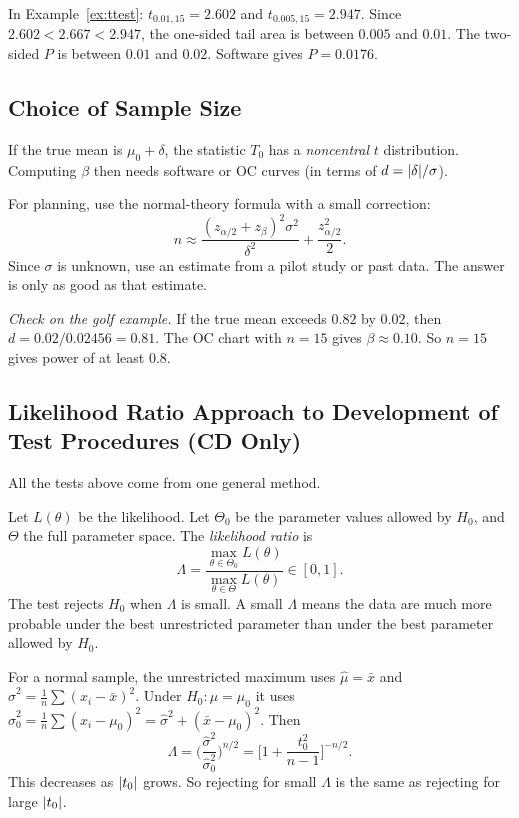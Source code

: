 In Example~\ref{ex:ttest}: $t_{0.01,15}=2.602$ and $t_{0.005,15}=2.947$. Since $2.602<2.667<2.947$, the one-sided tail area is between $0.005$ and $0.01$. The two-sided $P$ is between $0.01$ and $0.02$. Software gives $P=0.0176$.

\subsection{Choice of Sample Size}

If the true mean is $\mu_0+\delta$, the statistic $T_0$ has a \emph{noncentral} $t$ distribution. Computing $\beta$ then needs software or OC curves (in terms of $d=\lvert\delta\rvert/\sigma$).

For planning, use the normal-theory formula with a small correction:
\[ n\approx\frac{(z_{\alpha/2}+z_\beta)^2\sigma^2}{\delta^2}+\frac{z_{\alpha/2}^2}2. \]
Since $\sigma$ is unknown, use an estimate from a pilot study or past data. The answer is only as good as that estimate.

\emph{Check on the golf example.} If the true mean exceeds $0.82$ by $0.02$, then $d=0.02/0.02456=0.81$. The OC chart with $n=15$ gives $\beta\approx0.10$. So $n=15$ gives power of at least $0.8$.

\subsection{Likelihood Ratio Approach to Development of Test Procedures (CD Only)}

All the tests above come from one general method.

\begin{definition}
Let $L(\theta)$ be the likelihood. Let $\Theta_0$ be the parameter values allowed by $H_0$, and $\Theta$ the full parameter space. The \emph{likelihood ratio} is
\[ \Lambda=\frac{\max_{\theta\in\Theta_0}L(\theta)}{\max_{\theta\in\Theta}L(\theta)}\in[0,1]. \]
The test rejects $H_0$ when $\Lambda$ is small. A small $\Lambda$ means the data are much more probable under the best unrestricted parameter than under the best parameter allowed by $H_0$.
\end{definition}

\begin{example}
For a normal sample, the unrestricted maximum uses $\hat\mu=\bar{x}$ and $\hat\sigma^2=\frac1n\sum(x_i-\bar{x})^2$. Under $H_0:\mu=\mu_0$ it uses $\hat\sigma_0^2=\frac1n\sum(x_i-\mu_0)^2=\hat\sigma^2+(\bar{x}-\mu_0)^2$. Then
\[ \Lambda=\Big(\frac{\hat\sigma^2}{\hat\sigma_0^2}\Big)^{n/2}=\Big[1+\frac{t_0^2}{n-1}\Big]^{-n/2}. \]
This decreases as $\lvert t_0\rvert$ grows. So rejecting for small $\Lambda$ is the same as rejecting for large $\lvert t_0\rvert$.
\end{example}

